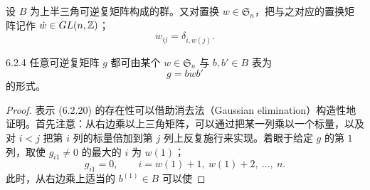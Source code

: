 设 $B$ 为上半三角可逆复矩阵构成的群。又对置换 $w\in\mathfrak{S}_n$，把与之对应的置换矩阵记作 $\dot{w}\in GL(n,\mathbb{Z})$；
\begin{equation}
  \dot{w}_{ij}=\delta_{i,w(j)}.
  \tag{6.2.19}
\end{equation}

\begin{theorem*}{6.2.4}
任意可逆复矩阵 $g$ 都可由某个 $w\in\mathfrak{S}_n$ 与 $b,b'\in B$ 表为
\begin{equation}
  g=b\dot{w}b'
  \tag{6.2.20}
\end{equation}
的形式。
\end{theorem*}

\begin{proof}
表示 (6.2.20) 的存在性可以借助消去法（Gaussian elimination）构造性地证明。首先注意：从右边乘以上三角矩阵，可以通过把某一列乘以一个标量，以及对 $i<j$ 把第 $i$ 列的标量倍加到第 $j$ 列上反复施行来实现。着眼于给定 $g$ 的第 $1$ 列，取使 $g_{i1}\ne0$ 的最大的 $i$ 为 $w(1)$；
\begin{equation}
  g_{i1}=0,\qquad i=w(1)+1,\ w(1)+2,\ \dots,\ n.
  \tag{6.2.21}
\end{equation}
此时，从右边乘上适当的 $b^{(1)}\in B$ 可以使


\end{proof}
